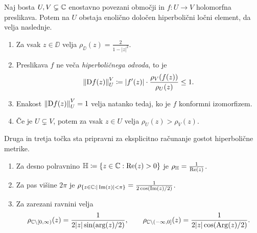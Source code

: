 \begin{izrek}[Pick] \label{thm:pick}
    Naj bosta \(U, V \subsetneq \mathbb C\) enostavno povezani območji in \(f \colon U \to V\) holomorfna preslikava. Potem na \(U\) obstaja enolično določen hiperbolični ločni element, da velja naslednje.
    \begin{enumerate}
        \item Za vsak \(z \in \DD\) velja \(\rho_{\DD} (z) = \frac{2}{1 - |z|^2}\).
        \item Preslikava \(f\) ne veča \emph{hiperboličnega odvoda}, to je \[\left\| \mathrm{D} f (z) \right\|_{U}^{V} \coloneq |f' (z)| \cdot \frac{\rho_V (f (z))}{\rho_U (z)} \leq 1.\]
        \item Enakost \(\left\| \mathrm{D} f (z) \right\|_{U}^{V} = 1\) velja natanko tedaj, ko je \(f\) konformni izomorfizem.
        \item Če je \(U \subsetneq V\), potem za vsak \(z \in U\) velja \(\rho_U (z) > \rho_V (z)\). 
    \end{enumerate}
\end{izrek}

\noindent Druga in tretja točka sta pripravni za eksplicitno računanje gostot hiperbolične metrike.

\begin{trditev} \label{prop:hypexamples} \mbox{}
    \begin{enumerate}
        \item Za desno polravnino \(\mathbb H \coloneq \{ z \in \mathbb C : \operatorname{Re} (z) > 0 \}\) je \(\rho_\mathbb H = \frac{1}{\operatorname{Re} (z)}\).
        \item Za pas višine \(2 \pi\) je \(\rho_{\{z \in \mathbb C : |\operatorname{Im} (z)| < \pi\}} = \frac{1}{2 \cos (\operatorname{Im} (z) / 2)}\).
        \item Za zarezani ravnini velja
            \[
                \rho_{\mathbb C \setminus [0, \infty)} (z) = \frac{1}{2 |z| \sin (\arg (z) / 2)},
                \qquad
                \rho_{\mathbb C \setminus (-\infty, 0]} (z) = \frac{1}{2 |z| \cos (\operatorname{Arg} (z) / 2)}.
            \]
    \end{enumerate}
\end{trditev}
